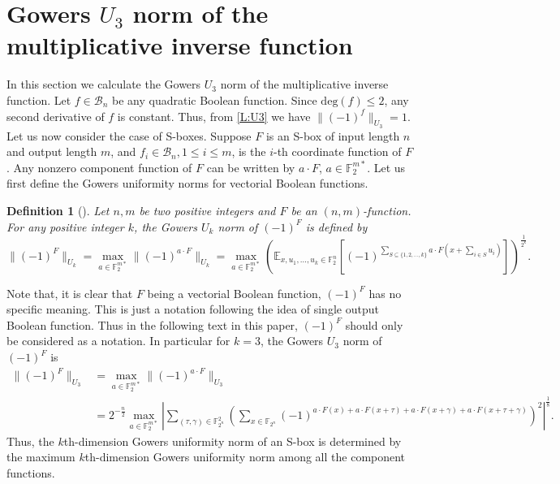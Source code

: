 \documentclass[12 pt]{article}
\newtheorem{definition}{Definition}
\def\E{{\mathbb E}}
\def\F{{\mathbb F}}
\begin{document}
{\section{Gowers $U_3$ norm of the multiplicative inverse function}
\label{sec:gw}
In this section we calculate the Gowers $U_3$ norm of the multiplicative inverse function. Let $f\in\mathcal B_n$ be any quadratic Boolean function. Since $\mathrm{deg}(f)\leq 2$, any second derivative of $f$ is constant. Thus, from \eqref{L:U3} we have $\|(-1)^f\|_{U_3}=1$.
Let us now consider the case of S-boxes. Suppose $F$ is {an S-box} of input length $n$ and output length $m$, and $f_i\in\mathcal B_n, 1\leq i\leq m$, is the $i$-th coordinate function of $F$. Any nonzero component function of $F$ can be written by $a\cdot F$, $a\in\mathbb F_2^{m*}$. Let us first define the Gowers uniformity norms for vectorial Boolean functions.
\begin{definition}[\cite{InverseFuncDAM2021}]\label{def-gower}
Let $n,m$ be two positive integers and $F$ be an $(n,m)$-function. For any positive integer $k$, the Gowers $U_k$ norm of $(-1)^F$  is defined by
\begin{equation*}
\|(-1)^F\|_{U_k}=\max_{a\in\mathbb F_2^{m*}} \|(-1)^{a\cdot F}\|_{U_k} = \max_{a\in\mathbb F_2^{m*}}
\left( \E_{x, u_1, \ldots, u_k \in \F_2^n}
\left[ (-1)^{\sum_{S \subseteq \{1,2,\ldots,k\}} a\cdot F\left( x + \sum_{i \in S}u_i \right)} \right] \right)^{\frac{1}{2^k}}.
\end{equation*}
\end{definition}
Note that, it is clear that $F$ being a vectorial Boolean function, $(-1)^F$ has no specific meaning. This is just a notation following the idea of single output Boolean function. Thus in the following text in this paper, $(-1)^F$ should only be considered as a notation.
In particular for $k=3$, the Gowers $U_3$ norm of $(-1)^F$ is
\begin{equation*}
\begin{split}
\|(-1)^F\|_{U_3}&=\max_{a\in\mathbb F_2^{m*}} \|(-1)^{a\cdot F}\|_{U_3}\\
&=2^{-{\frac n2}}\max_{a\in\mathbb F_2^{m*}}
\left|\sum_{(\tau,\gamma)\in\F_{2^n}^2}\left(\sum_{x\in\F_{2^n}}(-1)^{a\cdot F(x)+a\cdot F(x+\tau)+a\cdot F(x+\gamma)+a\cdot F(x+\tau+\gamma)}\right)^2\right|^{\frac 18}.
\end{split}
\end{equation*}
Thus, the $k$th-dimension Gowers uniformity norm of an S-box is determined by the maximum $k$th-dimension Gowers uniformity norm among all the component functions.


}
\end{document}
